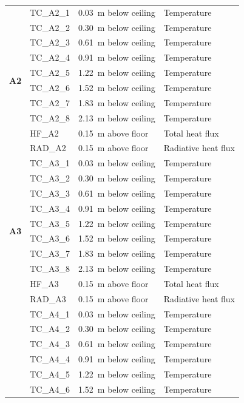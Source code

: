 \documentclass[12pt,oneside]{book}
\begin{document}
\begin{longtable}[c]{c|lll}
\midrule
\multirow{10}{*}{\large{\textbf{A2}}}
 & TC\_A2\_1  & 0.03~m below ceiling & Temperature \\
 & TC\_A2\_2  & 0.30~m below ceiling & Temperature \\
 & TC\_A2\_3  & 0.61~m below ceiling & Temperature \\
 & TC\_A2\_4  & 0.91~m below ceiling & Temperature \\
 & TC\_A2\_5  & 1.22~m below ceiling & Temperature \\
 & TC\_A2\_6  & 1.52~m below ceiling & Temperature \\
 & TC\_A2\_7  & 1.83~m below ceiling & Temperature \\
 & TC\_A2\_8  & 2.13~m below ceiling & Temperature \\
\cline{2-4}
 & HF\_A2	  & 0.15~m above floor   & Total heat flux \\
 & RAD\_A2    & 0.15~m above floor   & Radiative heat flux \\
\midrule
 \multirow{10}{*}{\large{\textbf{A3}}}
 & TC\_A3\_1  & 0.03~m below ceiling & Temperature \\
 & TC\_A3\_2  & 0.30~m below ceiling & Temperature \\
 & TC\_A3\_3  & 0.61~m below ceiling & Temperature \\
 & TC\_A3\_4  & 0.91~m below ceiling & Temperature \\
 & TC\_A3\_5  & 1.22~m below ceiling & Temperature \\
 & TC\_A3\_6  & 1.52~m below ceiling & Temperature \\
 & TC\_A3\_7  & 1.83~m below ceiling & Temperature \\
 & TC\_A3\_8  & 2.13~m below ceiling & Temperature \\
\cline{2-4}
 & HF\_A3	  & 0.15~m above floor   & Total heat flux \\
 & RAD\_A3    & 0.15~m above floor   & Radiative heat flux \\
\bottomrule
\newpage
\multirow{13}{*}{\large\textbf{A4}}
 & TC\_A4\_1  & 0.03~m below ceiling & Temperature \\
 & TC\_A4\_2  & 0.30~m below ceiling & Temperature \\
 & TC\_A4\_3  & 0.61~m below ceiling & Temperature \\
 & TC\_A4\_4  & 0.91~m below ceiling & Temperature \\
 & TC\_A4\_5  & 1.22~m below ceiling & Temperature \\
 & TC\_A4\_6  & 1.52~m below ceiling & Temperature \\

\end{longtable}
\end{document}
